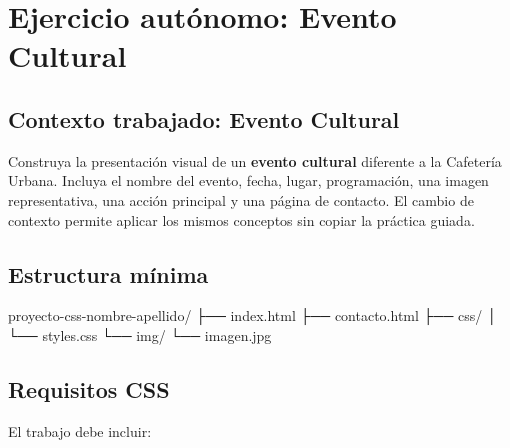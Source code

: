 \documentclass[11pt]{article}
\begin{document}
    \section{Ejercicio autónomo: Evento Cultural}

    \subsection{Contexto trabajado: Evento Cultural}

    Construya la presentación visual de un \textbf{evento cultural} diferente a la
    Cafetería Urbana. Incluya el nombre del evento, fecha, lugar, programación, una
    imagen representativa, una acción principal y una página de contacto. El cambio
    de contexto permite aplicar los mismos conceptos sin copiar la práctica guiada.

    \subsection{Estructura mínima}

    \begin{bashcodedark}
        proyecto-css-nombre-apellido/
        ├── index.html
        ├── contacto.html
        ├── css/
        │   └── styles.css
        └── img/
            └── imagen.jpg
    \end{bashcodedark}

    \subsection{Requisitos CSS}

    El trabajo debe incluir:
\end{document}
